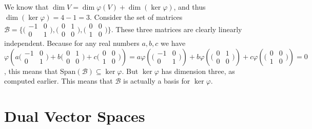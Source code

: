 {\begin{enumerate}[label=(\alph*)]
We know that $\dim V=\dim\varphi(V)+\dim(\ker\varphi)$, and thus $\dim(\ker\varphi)=4-1=3$. Consider the set of matrices $\mathcal{B}=\{\bigl(\begin{smallmatrix}-1&0\\0&1\end{smallmatrix}\bigr),\bigl(\begin{smallmatrix}0&1\\0&0\end{smallmatrix}\bigr),\bigl(\begin{smallmatrix}0&0\\1&0\end{smallmatrix}\bigr)\}$. These three matrices are clearly linearly independent. Because for any real numbers $a,b,c$ we have $\varphi(a\bigl(\begin{smallmatrix}-1&0\\0&1\end{smallmatrix}\bigr)+b\bigl(\begin{smallmatrix}0&1\\0&0\end{smallmatrix}\bigr)+c\bigl(\begin{smallmatrix}0&0\\1&0\end{smallmatrix}\bigr))=a\varphi(\bigl(\begin{smallmatrix}-1&0\\0&1\end{smallmatrix}\bigr))+b\varphi(\bigl(\begin{smallmatrix}0&1\\0&0\end{smallmatrix}\bigr))+c\varphi(\bigl(\begin{smallmatrix}0&0\\1&0\end{smallmatrix}\bigr))=0$, this means that $\text{Span}(\mathcal{B})\subseteq\ker\varphi$. But $\ker\varphi$ has dimension three, as computed earlier. This means that $\mathcal{B}$ is actually a basis for $\ker\varphi$.
\end{enumerate}
}

\section{Dual Vector Spaces}

